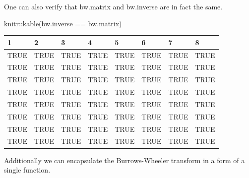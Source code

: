 \documentclass[
]{book}
\newenvironment{Shaded}{\begin{snugshade}}{\end{snugshade}}
\newcommand{\FunctionTok}[1]{\textcolor[rgb]{0.00,0.00,0.00}{#1}}
\newcommand{\NormalTok}[1]{#1}
\newcommand{\SpecialCharTok}[1]{\textcolor[rgb]{0.00,0.00,0.00}{#1}}
\begin{document}
One can also verify that bw.matrix and bw.inverse are in fact the same.

\begin{Shaded}
\begin{Highlighting}[numbers=left,,]
\NormalTok{knitr}\SpecialCharTok{::}\FunctionTok{kable}\NormalTok{(bw.inverse }\SpecialCharTok{==}\NormalTok{ bw.matrix)}
\end{Highlighting}
\end{Shaded}

\begin{tabular}{l|l|l|l|l|l|l|l}
\hline
1 & 2 & 3 & 4 & 5 & 6 & 7 & 8\\
\hline
TRUE & TRUE & TRUE & TRUE & TRUE & TRUE & TRUE & TRUE\\
\hline
TRUE & TRUE & TRUE & TRUE & TRUE & TRUE & TRUE & TRUE\\
\hline
TRUE & TRUE & TRUE & TRUE & TRUE & TRUE & TRUE & TRUE\\
\hline
TRUE & TRUE & TRUE & TRUE & TRUE & TRUE & TRUE & TRUE\\
\hline
TRUE & TRUE & TRUE & TRUE & TRUE & TRUE & TRUE & TRUE\\
\hline
TRUE & TRUE & TRUE & TRUE & TRUE & TRUE & TRUE & TRUE\\
\hline
TRUE & TRUE & TRUE & TRUE & TRUE & TRUE & TRUE & TRUE\\
\hline
TRUE & TRUE & TRUE & TRUE & TRUE & TRUE & TRUE & TRUE\\
\hline
\end{tabular}

Additionally we can encapsulate the Burrows-Wheeler transform in a form of a single function.
\end{document}
